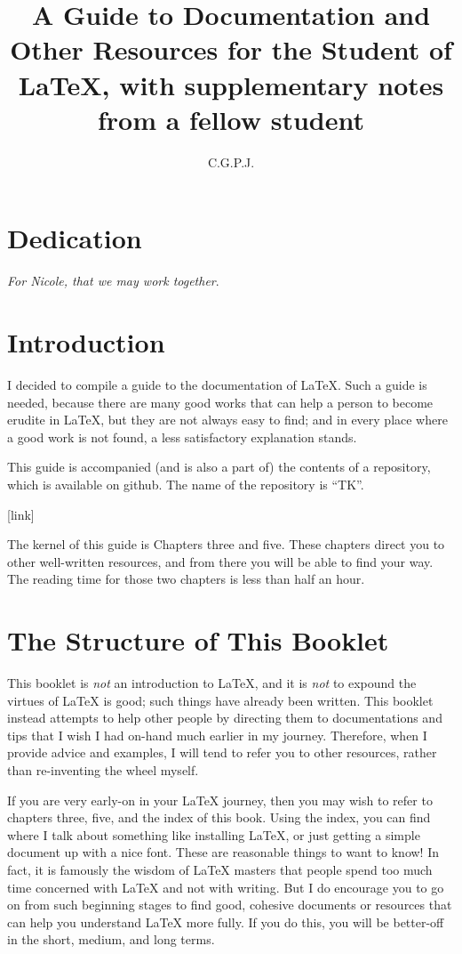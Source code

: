 \documentclass[12pt, oneside]{memoir}
\title{A Guide to Documentation and Other Resources for the Student of \LaTeX{}, with supplementary notes from a fellow student}
\author{C.\thinspace G.\thinspace P.\thinspace J.\thinspace}
\begin{document}
\maketitle
\thispagestyle{empty}

\RaggedRight

\chapter*{Dedication}
\emph{For Nicole, that we may work together}.

\newpage
\tableofcontents

\chapter{Introduction}
I decided to compile a guide to the documentation of \LaTeX{}. Such a guide is needed, because there are many good works that can help a person to become erudite in \LaTeX{}, but they are not always easy to find; and in every place where a good work is not found, a less satisfactory explanation stands.

This guide is accompanied (and is also a part of) the contents of a repository, which is available on github. The name of the repository is ``TK''.

[link]

The kernel of this guide is Chapters three and five. These chapters direct you to other well-written resources, and from there you will be able to find your way. The reading time for those two chapters is less than half an hour.

\chapter{The Structure of This Booklet}
This booklet is \emph{not} an introduction to \LaTeX{}, and it is \emph{not} to expound the virtues of \LaTeX{} is good; such things have already been written. This booklet instead attempts to help other people by directing them to documentations and tips that I wish I had on-hand much earlier in my journey. Therefore, when I provide advice and examples, I will tend to refer you to other resources, rather than re-inventing the wheel myself.

If you are very early-on in your \LaTeX{} journey, then you may wish to refer to chapters three, five, and the index of this book. Using the index, you can find where I talk about something like installing \LaTeX{}, or just getting a simple document up with a nice font. These are reasonable things to want to know! In fact, it is famously the wisdom of \LaTeX{} masters that people spend too much time concerned with \LaTeX{} and not with writing. But I do encourage you to go on from such beginning stages to find good, cohesive documents or resources that can help you understand \LaTeX{} more fully. If you do this, you will be better-off in the short, medium, and long terms.
\end{document}
